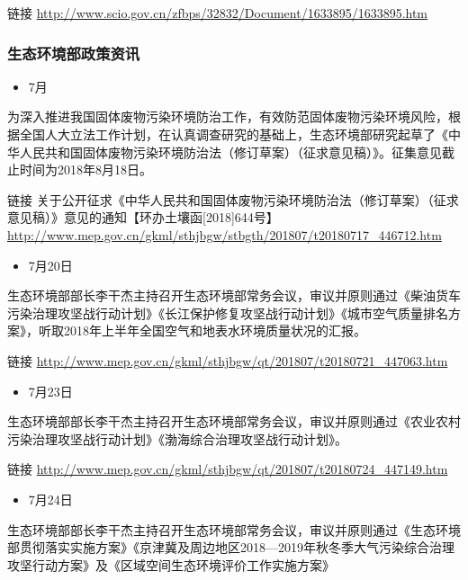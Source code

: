 \documentclass[]{book}
\providecommand{\tightlist}{%
  \setlength{\itemsep}{0pt}\setlength{\parskip}{0pt}}
\begin{document}
链接
\url{http://www.scio.gov.cn/zfbps/32832/Document/1633895/1633895.htm}

\subsubsection*{生态环境部政策资讯}\label{-3}

\begin{itemize}
\tightlist
\item
  7月
\end{itemize}

为深入推进我国固体废物污染环境防治工作，有效防范固体废物污染环境风险，根据全国人大立法工作计划，在认真调查研究的基础上，生态环境部研究起草了《中华人民共和国固体废物污染环境防治法（修订草案）（征求意见稿）》。征集意见截止时间为2018年8月18日。

链接
关于公开征求《中华人民共和国固体废物污染环境防治法（修订草案）（征求意见稿）》意见的通知【环办土壤函{[}2018{]}644号】\url{http://www.mep.gov.cn/gkml/sthjbgw/stbgth/201807/t20180717_446712.htm}

\begin{itemize}
\tightlist
\item
  7月20日
\end{itemize}

生态环境部部长李干杰主持召开生态环境部常务会议，审议并原则通过《柴油货车污染治理攻坚战行动计划》《长江保护修复攻坚战行动计划》《城市空气质量排名方案》，听取2018年上半年全国空气和地表水环境质量状况的汇报。

链接
\url{http://www.mep.gov.cn/gkml/sthjbgw/qt/201807/t20180721_447063.htm}

\begin{itemize}
\tightlist
\item
  7月23日
\end{itemize}

生态环境部部长李干杰主持召开生态环境部常务会议，审议并原则通过《农业农村污染治理攻坚战行动计划》《渤海综合治理攻坚战行动计划》。

链接
\url{http://www.mep.gov.cn/gkml/sthjbgw/qt/201807/t20180724_447149.htm}

\begin{itemize}
\tightlist
\item
  7月24日
\end{itemize}

生态环境部部长李干杰主持召开生态环境部常务会议，审议并原则通过《生态环境部贯彻落实实施方案》《京津冀及周边地区2018---2019年秋冬季大气污染综合治理攻坚行动方案》及《区域空间生态环境评价工作实施方案》
\end{document}
